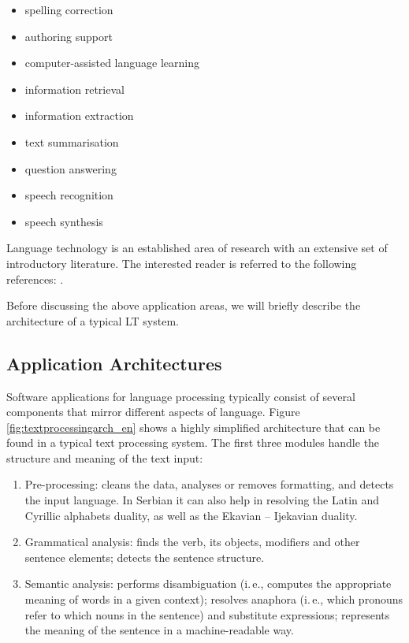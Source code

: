 \begin{multicols}{2}
\begin{itemize}
\item spelling correction
\item authoring support
\item computer-assisted language learning
\item information retrieval 
\item information extraction
\item text summarisation
\item question answering
\item speech recognition 
\item speech synthesis 
\end{itemize}

Language technology is an established area of research with an extensive set of introductory literature. The interested reader is referred to the following references:  \cite{jurafsky-martin01, manning-schuetze1, lt-survey1}.

Before discussing the above application areas, we will briefly describe the architecture of a typical LT system.

 \subsection {Application Architectures}
   
Software applications for language processing typically consist of several components that mirror different aspects of language. Figure \ref{fig:textprocessingarch_en} shows a highly simplified architecture that can be found in a typical text processing system. The first three modules handle the structure and meaning of the text input:

\begin{enumerate}
 \item Pre-processing: cleans the data, analyses or removes formatting, and detects the input language. In Serbian it can also help in resolving the Latin and Cyrillic alphabets duality, as well as the Ekavian – Ijekavian duality.
\item Grammatical analysis: finds the verb, its objects, modifiers and other sentence elements; detects the sentence structure.
\item Semantic analysis: performs disambiguation (i.\,e., computes the appropriate meaning of words in a given context); resolves anaphora (i.\,e., which pronouns refer to which nouns in the sentence) and substitute expressions; represents the meaning of the sentence in a machine-readable way.
\end{enumerate}


\end{multicols}
